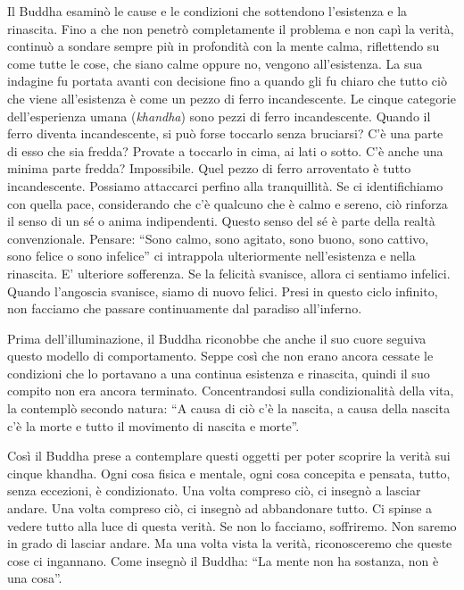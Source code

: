 Il Buddha esaminò le cause e le condizioni che sottendono l'esistenza e
la rinascita. Fino a che non penetrò completamente il problema e non
capì la verità, continuò a sondare sempre più in profondità con la mente
calma, riflettendo su come tutte le cose, che siano calme oppure no,
vengono all'esistenza. La sua indagine fu portata avanti con decisione
fino a quando gli fu chiaro che tutto ciò che viene all'esistenza è come
un pezzo di ferro incandescente. Le cinque categorie dell'esperienza
umana (\emph{khandha}) sono pezzi di ferro incandescente. Quando il ferro
diventa incandescente, si può forse toccarlo senza bruciarsi? C'è una
parte di esso che sia fredda? Provate a toccarlo in cima, ai lati o
sotto. C'è anche una minima parte fredda? Impossibile. Quel pezzo di
ferro arroventato è tutto incandescente. Possiamo attaccarci perfino
alla tranquillità. Se ci identifichiamo con quella pace, considerando
che c'è qualcuno che è calmo e sereno, ciò rinforza il senso di un sé o
anima indipendenti. Questo senso del sé è parte della realtà
convenzionale. Pensare: ``Sono calmo, sono agitato, sono buono, sono
cattivo, sono felice o sono infelice'' ci intrappola ulteriormente
nell'esistenza e nella rinascita. E' ulteriore sofferenza. Se la
felicità svanisce, allora ci sentiamo infelici. Quando l'angoscia
svanisce, siamo di nuovo felici. Presi in questo ciclo infinito, non
facciamo che passare continuamente dal paradiso all'inferno.

Prima dell'illuminazione, il Buddha riconobbe che anche il suo cuore
seguiva questo modello di comportamento. Seppe così che non erano ancora
cessate le condizioni che lo portavano a una continua esistenza e
rinascita, quindi il suo compito non era ancora terminato.
Concentrandosi sulla condizionalità della vita, la contemplò secondo
natura: ``A causa di ciò c'è la nascita, a causa della nascita c'è la
morte e tutto il movimento di nascita e morte''.

Così il Buddha prese a
contemplare questi oggetti per poter scoprire la verità sui cinque
khandha. Ogni cosa fisica e mentale, ogni cosa concepita e pensata,
tutto, senza eccezioni, è condizionato. Una volta compreso ciò, ci
insegnò a lasciar andare. Una volta compreso ciò, ci insegnò ad
abbandonare tutto. Ci spinse a vedere tutto alla luce di questa verità.
Se non lo facciamo, soffriremo. Non saremo in grado di lasciar andare.
Ma una volta vista la verità, riconosceremo che queste cose ci
ingannano. Come insegnò il Buddha: ``La mente non ha sostanza, non è una
cosa''.

